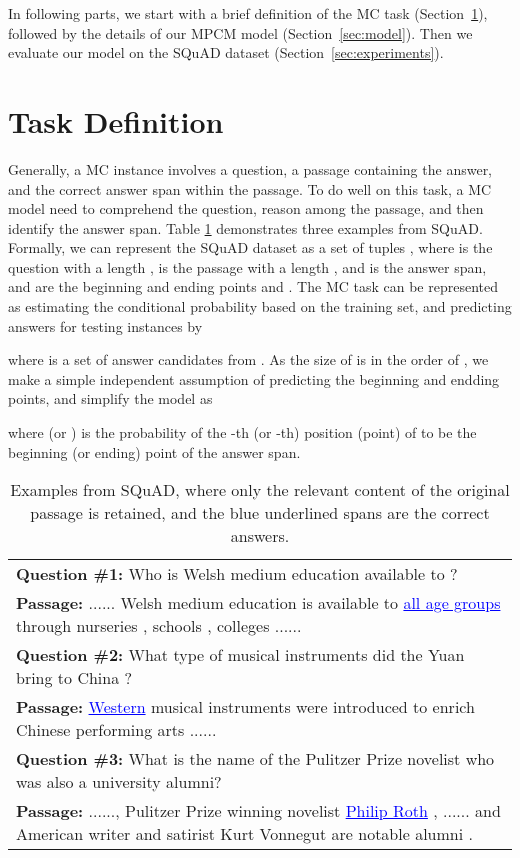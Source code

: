 \documentclass[11pt,letterpaper]{article}
\begin{document}
In following parts, we start with a brief definition of the MC task (Section~\ref{sec:definition}), 
followed by the details of our MPCM model (Section~\ref{sec:model}).
Then we evaluate our model on the SQuAD dataset (Section~\ref{sec:experiments}).


\section{Task Definition}
\label{sec:definition}

Generally, a MC instance involves a question, a passage containing the answer, and the correct answer span within the passage. 
To do well on this task, a MC model need to comprehend the question, reason among the passage, and then identify the answer span. 
Table \ref{tab:example} demonstrates three examples from SQuAD. 
Formally, we can represent the SQuAD dataset as a set of tuples , 
where  is the question with a length , 
 is the passage with a length , 
and  is the answer span, 
 and  are the beginning and ending points and . 
The MC task can be represented as estimating the conditional probability  based on the training set, 
and predicting answers for testing instances by 

where  is a set of answer candidates from . 
As the size of  is in the order of , 
we make a simple independent assumption of predicting the beginning and endding points, 
and simplify the model as 

where  (or ) 
is the probability of the -th (or -th) position (point) of  
to be the beginning (or ending) point of the answer span. 

\begin{table}[t]
\setlength{\tabcolsep}{0pt}
\centering
\small
\begin{tabular}{p{}}  
\toprule
\textbf{Question \#1:} Who is Welsh medium education available to ? \\
\textbf{Passage:} ...... Welsh medium education is available to \textcolor{blue}{\underline{all age groups}} through nurseries , schools , colleges ......\\
\midrule
\textbf{Question \#2:} What type of musical instruments did the Yuan bring to China ? \\
\textbf{Passage:}  \textcolor{blue}{\underline{Western}} musical instruments were introduced to enrich Chinese performing arts ...... \\
\midrule
\textbf{Question \#3:} What is the name of the Pulitzer Prize novelist who was also a university alumni? \\
\textbf{Passage:} ......, Pulitzer Prize winning novelist  \textcolor{blue}{\underline{Philip Roth}} , ...... and American writer and satirist Kurt Vonnegut are notable alumni . \\
\bottomrule
\end{tabular}
\caption{Examples from SQuAD, where only the relevant content of the original passage is retained, and the blue underlined spans are the correct answers.}
\label{tab:example}
\end{table}
\end{document}
